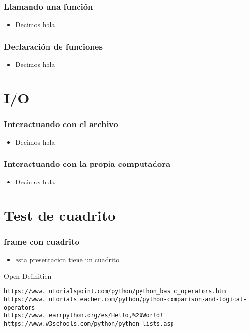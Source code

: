 \documentclass[hyperref={pdfpagelabels=false},xcolor=pst,pdf,fragile]{beamer}
\begin{document}
\begin{frame}
    \frametitle{Llamando una función}
    \pause
    \begin{itemize}
    \item Decimos hola
    \end{itemize}
\end{frame}

\begin{frame}
    \frametitle{Declaración de funciones}
    \pause
    \begin{itemize}
    \item Decimos hola
    \end{itemize}
\end{frame}

\section{I/O}
\begin{frame}
    \frametitle{Interactuando con el archivo}
    \pause
    \begin{itemize}
    \item Decimos hola
    \end{itemize}
\end{frame}

\begin{frame}
    \frametitle{Interactuando con la propia computadora}
    \pause
    \begin{itemize}
    \item Decimos hola
    \end{itemize}
\end{frame}

\section{Test de cuadrito}
\begin{frame}[fragile]
  \frametitle{frame con cuadrito }
  \begin{itemize}
	\item esta presentacion tiene un cuadrito
	\pause
  \end{itemize}

    \begin{block}{Open Definition} %
	  \begin{lstlisting}
https://www.tutorialspoint.com/python/python_basic_operators.htm
https://www.tutorialsteacher.com/python/python-comparison-and-logical-operators
https://www.learnpython.org/es/Hello,%20World!
https://www.w3schools.com/python/python_lists.asp
	  \end{lstlisting}
  \end{block}
  
\end{frame}
\end{document}
